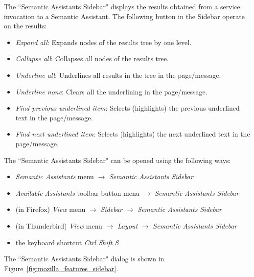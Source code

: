 The ``Semantic Assistants Sidebar" displays the results obtained from a service invocation to a Semantic Assistant. The following button in the Sidebar operate on the results: 
\begin{itemize} 
  \item \emph{Expand all}: Expands nodes of the results tree by one level.
  \item \emph{Collapse all}: Collapses all nodes of the results tree.
  \item \emph{Underline all}: Underlines all results in the tree in the page/message.
  \item \emph{Underline none}: Clears all the underlining in the page/message.
  \item \emph{Find previous underlined item}: Selects (highlights) the previous underlined text in the page/message.
  \item \emph{Find next underlined item}: Selects (highlights) the next underlined text in the page/message.
\end{itemize} 
The ``Semantic Assistants Sidebar" can be opened using the following ways: 
\begin{itemize} 
  \item \emph{Semantic Assistants} menu $\rightarrow$ \emph{Semantic Assistants Sidebar}
  \item \emph{Available Assistants} toolbar button menu $\rightarrow$ \emph{Semantic Assistants Sidebar}
  \item (in Firefox) \emph{View} menu $\rightarrow$ \emph{Sidebar} $\rightarrow$ \emph{Semantic Assistants Sidebar}
  \item (in Thunderbird) \emph{View} menu $\rightarrow$ \emph{Layout} $\rightarrow$ \emph{Semantic Assistants Sidebar}
  \item the keyboard shortcut \emph{Ctrl Shift S}
\end{itemize} 

The ``Semantic Assistants Sidebar" dialog is shown in Figure~\ref{fig:mozilla_features_sidebar}. 

